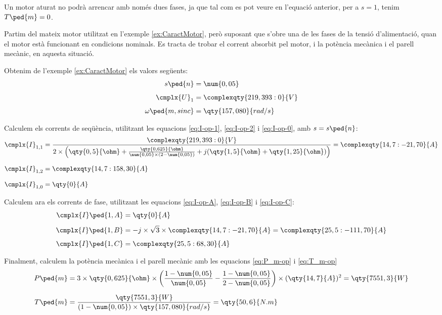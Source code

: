 	    
Un motor aturat no podrà arrencar amb només dues fases, ja que tal com es pot veure en l'equació anterior, per a  $s=1$, tenim $T\ped{m}=0$.	    

	
\begin{exemple}\label{ex:MotorFaseOberta}
\addcontentsxms{\MotorFaseOberta}
	Partim del mateix motor utilitzat en l'exemple \vref{ex:CaractMotor}, però suposant que s'obre una de les fases de la tensió d'alimentació, quan el motor està funcionant en condicions nominals. Es tracta de trobar el corrent absorbit pel motor, i la potència mecànica i el parell mecànic, en aquesta situació.
	
	Obtenim de l'exemple \ref{ex:CaractMotor} els valors següents:
	\begin{align*}
		s\ped{n} &= \num{0,05} \\[1ex]
		\cmplx{U}_1 &=  \complexqty{219,393:0}{V} \\[1ex]
		\omega\ped{m,sinc} &= \qty{157,080}{rad/s}
	\end{align*}

	Calculem els corrents de seqüència, utilitzant les equacions \eqref{eq:I-op-1}, \eqref{eq:I-op-2} i \eqref{eq:I-op-0}, amb $s = s\ped{n}$:
	\begin{align*}
		\cmplx{I}_{1,1} &= \frac{\complexqty{219,393:0}{V}}{2\times \left(\qty{0,5}{\ohm} + \frac{\qty{0,625}{\ohm}}{\num{0,05}\times(2-\num{0,05})} + j (\qty{1,5}{\ohm}+\qty{1,25}{\ohm}) \right)} = \complexqty{14,7:-21,70}{A} \\[1.5ex]
		\cmplx{I}_{1,2}  &=  \complexqty{14,7:158,30}{A} \\[1.5ex]
		\cmplx{I}_{1,0}  &= \qty{0}{A}
	\end{align*}
	
	Calculem ara els corrents de fase, utilitzant les equacions \eqref{eq:I-op-A}, \eqref{eq:I-op-B} i \eqref{eq:I-op-C}:
	\begin{align*}
		\cmplx{I}\ped{1,A} &= \qty{0}{A} \\[1ex]
		\cmplx{I}\ped{1,B}  &=  -j \times\sqrt{3} \times \complexqty{14,7:-21,70}{A} =  \complexqty{25,5:-111,70}{A}  \\[1ex]
		\cmplx{I}\ped{1,C}  &= \complexqty{25,5:68,30}{A}   
	\end{align*}
	
	Finalment, calculem la potència mecànica i el parell mecànic amb les equacions \eqref{eq:P_m-op} i \eqref{eq:T_m-op}
	\begin{align*}
		P\ped{m} &= 3\times \qty{0,625}{\ohm} \times \left(\frac{1-\num{0,05}}{\num{0,05}} - \frac{1-\num{0,05}}{2-\num{0,05}} \right) \times (\qty{14,7}{A})^2  = \qty{7551,3}{W}\\[1.5ex]
		T\ped{m} &= \frac{\qty{7551,3}{W}}{(1-\num{0,05}) \times \qty{157,080}{rad/s}}  = \qty{50,6}{N.m}
	\end{align*}
	

\end{exemple}
